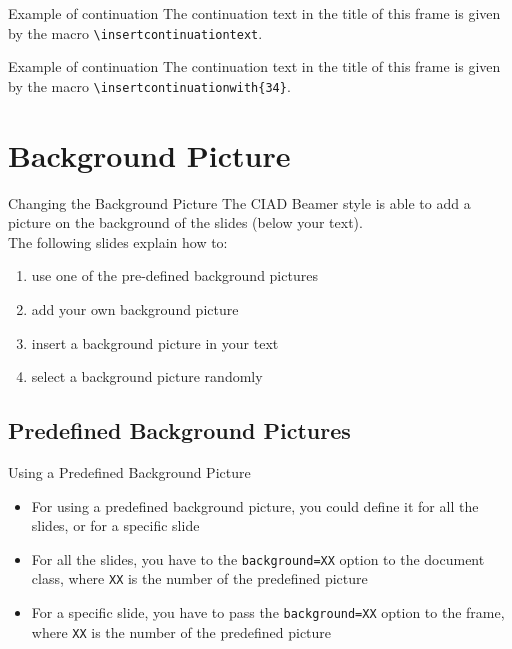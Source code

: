 \documentclass[english,sectioncirclenumberstyle]{ciadbeamer}
\begin{document}
\begin{frame}{Example of continuation \insertcontinuationtext}
	The continuation text in the title of this frame is given by the macro \texttt{{\textbackslash}insertcontinuationtext}.
\end{frame}

\begin{frame}{Example of continuation }
	The continuation text in the title of this frame is given by the macro \texttt{{\textbackslash}insertcontinuationwith\{34\}}.
\end{frame}


\section{Background Picture}
\sectiontableofcontentslide

\begin{frame}{Changing the Background Picture}
	The CIAD Beamer style is able to add a picture on the background of the slides (below your text). \\[.5cm]
	The following slides explain how to:
	\begin{enumerate}
		\item use one of the pre-defined background pictures
		\item add your own background picture
		\item insert a background picture in your text
		\item select a background picture randomly
	\end{enumerate}
\end{frame}

\subsection{Predefined Background Pictures}

\begin{frame}{Using a Predefined Background Picture}
	\begin{itemize}
		\item For using a predefined background picture, you could define it for all the slides, or for a specific slide \\[.5cm]
		\item For all the slides, you have to the \texttt{background=XX} option to the document class, where \texttt{XX} is the number of the predefined picture \\[.5cm]
		\item For a specific slide, you have to pass the \texttt{background=XX} option to the frame, where \texttt{XX} is the number of the predefined picture
	\end{itemize}
\end{frame}
\end{document}
